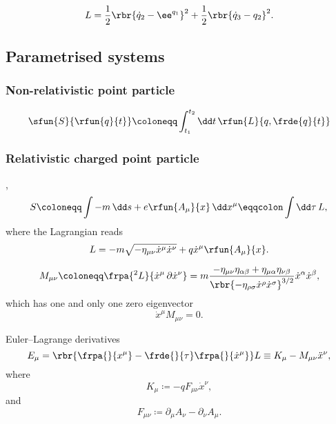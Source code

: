 \documentclass[a4paper,11pt]{article}
\begin{document}
\begin{equation}
L = \frac{1}{2} \rbr{\dot{q}_2 - \ee^{q_1}}^2 + \frac{1}{2} \rbr{\dot{q}_3 - 
q_2}^2.
\end{equation}



\subsection{Parametrised systems}

\subsubsection*{Non-relativistic point particle}

\cite[sec.\ 3.1.1]{Kiefer2012}
\begin{equation}
\sfun{S}{\rfun{q}{t}} \coloneqq \int_{t_1}^{t_2}\dd t\,\rfun{L}{q, \frde{q}{t}}
\end{equation}



\subsubsection*{Relativistic charged point particle}

\cite[sec.\ 16]{Landau1975},
\cite[sec.\ 3.1.2]{Kiefer2012}
\begin{equation}
S \coloneqq \int -m\,\dd s + e \rfun{A_\mu}{x} \,\dd x^\mu \eqqcolon \int\dd 
\tau\, L,\\
\label{eq:point-charged-action}
\end{equation}
where the Lagrangian reads
\begin{equation}
L = -m \sqrt{-\eta_{\mu\nu} \dot{x}^\mu \dot{x}^\nu } + q \dot{x}^\mu 
\rfun{A_\mu}{x}.
\end{equation}

\begin{equation}
M_{\mu\nu} \coloneqq \frpa{^2 L}{\dot{x}^\mu\,\partial \dot{x}^\nu} = 
m\frac{-\eta_{\mu\nu}\eta_{\alpha\beta} + \eta_{\mu\alpha}\eta_{\nu\beta}}%
{\rbr{-\eta_{\rho\sigma}\dot{x}^\rho \dot{x}^\sigma}^{3/2}} \dot{x}^\alpha 
\dot{x}^\beta,
\end{equation}
which has one and only one zero eigenvector
\begin{equation}
\dot{x}^\mu M_{\mu\nu} = 0.
\end{equation}

Euler--Lagrange derivatives
\begin{equation}
E_\mu = \rbr{\frpa{}{x^\mu}-\frde{}{\tau}\frpa{}{\dot{x}^\mu}} L
\equiv K_\mu - M_{\mu\nu}\ddot{x}^\nu,
\label{eq:point-charged-eld}
\end{equation}
where
\begin{equation}
K_\mu \coloneqq -q F_{\mu\nu} \dot{x}^\nu,
\end{equation}
and
\begin{equation}
F_{\mu\nu} \coloneqq \partial_\mu A_\nu - \partial_\nu A_\mu.
\end{equation}
\end{document}
